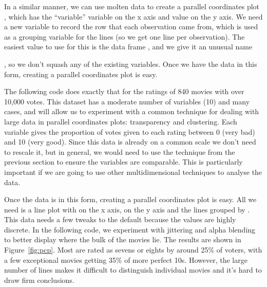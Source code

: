 In a similar manner, we can use molten data to create a parallel coordinates plot \citep{inselberg:1985,wegman:1990}, which has the ``variable'' variable on the x axis and value on the y axis.  We need a new variable to record the row that each observation came from, which is used as a grouping variable for the lines (so we get one line per observation). The easiest value to use for this is the data frame , and we give it an unusual name {, so we don't squash any of the existing variables. Once we have the data in this form, creating a parallel coordinates plot is easy.

The following code does exactly that for the ratings of 840 movies with over 10,000 votes. This dataset has a moderate number of variables (10) and many cases, and will allow us to experiment with a common technique for dealing with large data in parallel coordinates plots: transparency and clustering. Each variable gives the proportion of votes given to each rating between 0 (very bad) and 10 (very good). Since this data is already on a common scale we don't need to rescale it, but in general, we would need to use the technique from the previous section to ensure the variables are comparable. This is particularly important if we are going to use other multidimensional techniques to analyse the data.

% 


Once the data is in this form, creating a parallel coordinates plot is easy. All we need is a line plot with  on the x axis,  on the y axis and the lines grouped by . This data needs a few tweaks to the default because the values are highly discrete. In the following code, we experiment with jittering and alpha blending to better display where the bulk of the movies lie. The results are shown in Figure~\ref{fig:pcp}. Most are rated as sevens or eights by around 25\% of voters, with a few exceptional movies getting 35\% of more perfect 10s. However, the large number of lines makes it difficult to distinguish individual movies and it's hard to draw firm conclusions.

%


}
